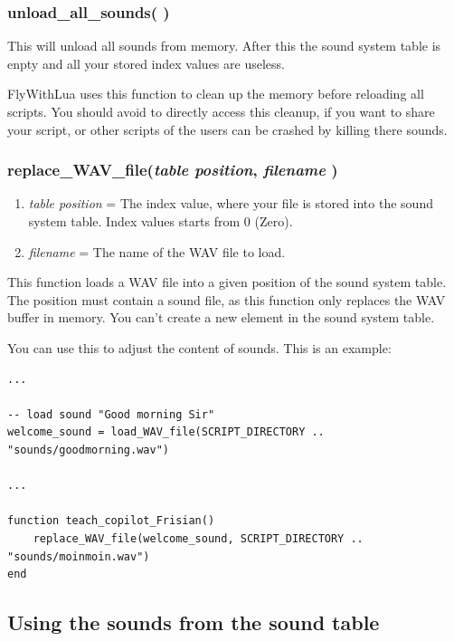 \documentclass[11pt,parskip=half,a4paper]{scrartcl}
\begin{document}
\subsubsection{ unload\_all\_sounds( )}

This will unload all sounds from memory. After this the sound system table is enpty and all your stored index values are useless.

FlyWithLua uses this function to clean up the memory before reloading all scripts. You should avoid to directly access this cleanup, if you want to share your script, or other scripts of the users can be crashed by killing there sounds.

\subsubsection{ replace\_WAV\_file(\emph{table position}, \emph{filename} )}

\begin{enumerate}
	\item \emph{table position} = The index value, where your file is stored into the sound system table. Index values starts from 0 (Zero).
	\item \emph{filename} = The name of the WAV file to load.
\end{enumerate}

This function loads a WAV file into a given position of the sound system table. The position must contain a sound file, as this function only replaces the WAV buffer in memory. You can't create a new element in the sound system table.

You can use this to adjust the content of sounds. This is an example:

\begin{lstlisting}
...

-- load sound "Good morning Sir"
welcome_sound = load_WAV_file(SCRIPT_DIRECTORY .. "sounds/goodmorning.wav")

...

function teach_copilot_Frisian()
    replace_WAV_file(welcome_sound, SCRIPT_DIRECTORY .. "sounds/moinmoin.wav")
end
\end{lstlisting}




\newpage
\subsection{Using the sounds from the sound table}
\end{document}
